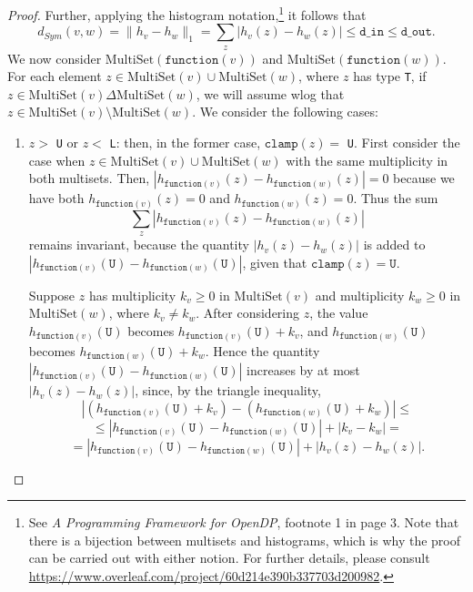 \documentclass[11pt,a4paper]{article}
\theoremstyle{definition}
\newcommand{\MultiSet}{\mathrm{MultiSet}}
\newcommand{\din}{\texttt{d\_in}}
\newcommand{\dout}{\texttt{d\_out}}
\newcommand{\clamp}{\texttt{clamp}}
\newcommand{\function}{\texttt{function}}
\newcommand{\grace}[1]{{ {\color{purple}{(grace)~#1}}}}
\begin{document}
\begin{proof}
Further, applying the histogram notation,\footnote{See \textit{A Programming Framework for OpenDP}, footnote 1 in page 3. Note that there is a bijection between multisets and histograms, which is why the proof can be carried out with either notion. For further details, please consult \url{https://www.overleaf.com/project/60d214e390b337703d200982}.}  it follows that
\[
d_{Sym}(v, w) = \lVert h_{v} - h_{w}\rVert_1 = \sum_z |h_v(z) - h_w(z)| \leq \din \leq \dout.
\]
We now consider $\MultiSet(\function(v))$ and $\MultiSet(\function(w))$.
For each element $z \in \MultiSet(v) \cup \MultiSet(w)$, where $z$ has type \texttt{T}, if $z \in \MultiSet(v) \Delta \MultiSet(w)$, we will assume wlog that $z \in \MultiSet(v) \setminus \MultiSet(w)$. We consider the following cases:

\begin{enumerate}
    \item $z >$ \texttt{U} or $z <$ \texttt{L}: then, in the former case, $\clamp(z) =$ \texttt{U}. First consider the case when $z \in \MultiSet(v) \cup \MultiSet(w)$ with the same multiplicity in both multisets. Then, $|h_{\function(v)}(z) - h_{\function(w)}(z)| = 0$ because we have both $h_{\function(v)}(z) = 0$ and $h_{\function(w)}(z) = 0$. Thus the sum
    \[
    \sum_z |h_{\function(v)}(z) - h_{\function(w)}(z)|
    \]
    remains invariant, because the quantity $|h_{v}(z) - h_{w}(z)|$ is added to $|h_{\function(v)}(\texttt{U}) - h_{\function(w)}(\texttt{U})|$, given that $\clamp(z) = \texttt{U}$. 
    
    
    Suppose $z$ has multiplicity $k_v \geq 0$ in $\MultiSet(v)$ and multiplicity $k_w \geq 0$ in $\MultiSet(w)$, where $k_v \neq k_w$. After considering $z$, the value $h_{\function(v)}(\texttt{U})$ becomes $h_{\function(v)}(\texttt{U}) + k_v$, and $h_{\function(w)}(\texttt{U})$ becomes $h_{\function(w)}(\texttt{U}) + k_w$. Hence the quantity $|h_{\function(v)}(\texttt{U}) - h_{\function(w)}(\texttt{U})|$ increases by at most $|h_v(z) - h_w(z)|$, since, by the triangle inequality,
    \[
         |(h_{\function(v)}(\texttt{U}) + k_v) - (h_{\function(w)}(\texttt{U}) + k_w)| \leq
    \]
    \[
         \leq |h_{\function(v)}(\texttt{U}) - h_{\function(w)}(\texttt{U})| + |k_v - k_w| =
    \]
    \[
        = |h_{\function(v)}(\texttt{U}) - h_{\function(w)}(\texttt{U})| + |h_v(z) - h_w(z)|.
    \]
    

\end{enumerate}
\end{proof}
\end{document}
